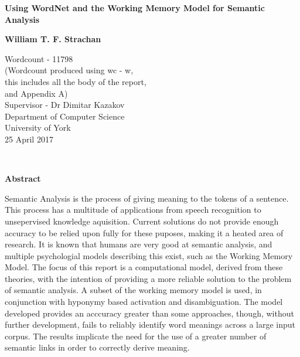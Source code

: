 \documentclass[]{article}
\begin{document}
\begin{titlepage}
    \begin{center}
        \vspace*{1cm}
        
        \Huge
        \textbf{Using WordNet and the Working Memory Model for Semantic Analysis}
        \vspace{2cm}
        
        \Large
        \textbf{William T. F. Strachan}
        
        \vfill
                
        \vspace{0.8cm}
        
        \Large
        Wordcount - 11798\\
        \small
        (Wordcount produced using wc - w, \\
        this includes all the body of the report,\\
         and Appendix A)\\
        \large
        \vspace{0.8cm}
        Supervisor - Dr Dimitar Kazakov\\
        Department of Computer Science\\
        University of York\\
        25 April 2017
        
    \end{center}
\end{titlepage}
\
\vfill
\begin{center} 
	\textbf{Abstract}
\end{center} 
\label{sec:Abstract}
Semantic Analysis is the process of giving meaning to the tokens of a sentence. This process has a multitude of applications from speech recognition to unsepervised knowledge aquisition. Current solutions do not provide enough accuracy to be relied upon fully for these puposes, making it a heated area of research. It is known that humans are very good at semantic analysis, and multiple psychologial models describing this exist, such as the Working Memory Model. The focus of this report is a computational model, derived from these theories, with the intention of providing a more reliable solution to the problem of semantic analysis. A subset of the working memory model is used, in conjunction with hyponymy based activation and disambiguation. The model developed provides an acccuracy greater than some approaches, though, without further development, fails to reliably identify word meanings across a large input corpus. The results implicate the need for the use of a greater number of semantic links in order to correctly derive meaning.
\end{document}
